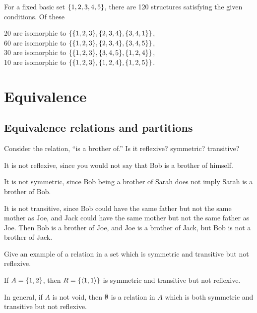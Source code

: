 \documentclass{report}
\begin{document}
\begin{solution}
For a fixed basic set $\left\{1,2,3,4,5\right\}$, there are 120 structures satisfying the given conditions.
Of these
\begin{center}
    20 are isomorphic to $\set{\set{1,2,3},\set{2,3,4},\set{3,4,1}}$,\\
    60 are isomorphic to $\set{\set{1,2,3},\set{2,3,4},\set{3,4,5}}$,\\
    30 are isomorphic to $\set{\set{1,2,3},\set{3,4,5},\set{1,2,4}}$,\\
    10 are isomorphic to $\set{\set{1,2,3},\set{1,2,4},\set{1,2,5}}$.
\end{center}
\end{solution}

\chapter{Equivalence}
\section{Equivalence relations and partitions}

\begin{exercise}
    Consider the relation, ``is a brother of.'' Is it reflexive? symmetric? transitive?
\end{exercise}

\begin{solution}
It is not reflexive, since you would not say that Bob is a brother of himself.

It is not symmetric, since Bob being a brother of Sarah does not imply Sarah is a brother of Bob.

It is not transitive, since Bob could have the same father but not the same mother as Joe,
and Jack could have the same mother but not the same father as Joe. Then Bob is a brother of Joe,
and Joe is a brother of Jack, but Bob is not a brother of Jack.
\end{solution}

\begin{exercise}
Give an example of a relation in a set which is symmetric and transitive but not
reflexive.
\end{exercise}

\begin{solution}
If $A=\left\{1,2\right\}$, then $R=\left\{\left\langle1,1\right\rangle\right\}$ is symmetric and transitive but not reflexive.

In general, if $A$ is not void, then $\emptyset$ is a relation in $A$ which is both
symmetric and transitive but not reflexive.
\end{solution}
\end{document}
